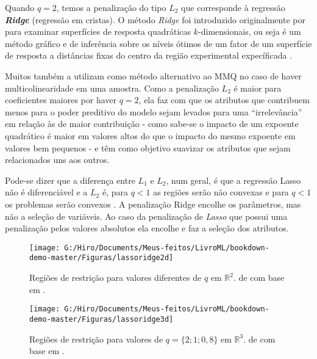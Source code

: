 \documentclass[
  openany]{book}
\begin{document}
Quando \(q=2\), temos a penalização do tipo \textbf{\(L_2\)} que corresponde à regressão \textbf{\emph{Ridge}} (regressão em cristas). O método \emph{Ridge} foi introduzido originalmente por \citet{hoerl1959optimum} para examinar superfícies de resposta quadráticas \(k\)-dimensionais, ou seja é um método gráfico e de inferência sobre os níveis ótimos de um fator de um superfície de resposta a distâncias fixas do centro da região experimental expecíficada \citep{do2009metodo}.

Muitos também a utilizam como método alternativo ao MMQ no caso de haver multicolinearidade em uma amostra. Como a penalização \(L_2\) é maior para coeficientes maiores por haver \(q=2\), ela faz com que os atributos que contribuem menos para o poder preditivo do modelo sejam levados para uma ``irrelevância'' em relação às de maior contribuição - como sabe-se o impacto de um expoente quadrático é maior em valores altos do que o impacto do mesmo expoente em valores bem pequenos - e têm como objetivo suavizar os atributos que sejam relacionados uns aos outros.

Pode-se dizer que a diferença entre \(L_1\) e \(L_2\), num geral, é que a regressão Lasso não é diferenciável e a \(L_2\) é, para \(q<1\) as regiões serão não convexas e para \(q<1\) os problemas serão convexos \citep{silva2018tecnica}. A penalização Ridge encolhe os parâmetros, mas não a seleção de variáveis. Ao caso da penalização de \emph{Lasso} que possui uma penalização pelos valores absolutos ela encolhe e faz a seleção dos atributos.

\begin{figure}

{\centering \texttt{[image: G:/Hiro/Documents/Meus-feitos/LivroML/bookdown-demo-master/Figuras/lassoridge2d]} 

}

\caption{Regiões de restrição para valores diferentes de \(q\) em \(\mathbb{R}^2\). de \citet{silva2018tecnica} com base em \citet{hastie2015statistical}.}\label{fig:lassoridge2d}
\end{figure}



\begin{figure}

{\centering \texttt{[image: G:/Hiro/Documents/Meus-feitos/LivroML/bookdown-demo-master/Figuras/lassoridge3d]} 

}

\caption{Regiões de restrição para valores de \(q=\{2;1;0,8\}\) em \(\mathbb{R}^3\). de \citet{silva2018tecnica} com base em \citet{hastie2015statistical}.}\label{fig:lassoridge3d}
\end{figure}
\end{document}
